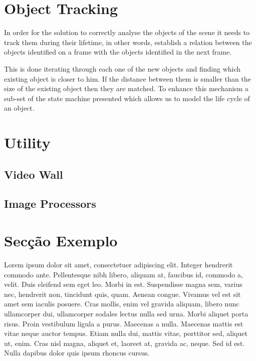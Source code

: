 \section{Object Tracking}

In order for the solution to correctly analyse  the objects of the scene it needs to track them during their lifetime, in other words, establish a relation between the objects identified on a frame with the objects identified in the next frame.

This is done iterating through each one of the new objects and finding which existing object is closer to him. If the distance between them is smaller than the size of the existing object then they are matched. To enhance this mechanism a sub-set of the state machine presented  which allows us to model the life cycle of an object. 




\section{Utility}

\subsection{Video Wall}

\subsection{Image Processors}

\section{Secção Exemplo}


Lorem ipsum dolor sit amet, consectetuer adipiscing elit. Integer
hendrerit commodo ante. Pellentesque nibh libero, aliquam at, faucibus
id, commodo a, velit. 
Duis eleifend sem eget leo. Morbi in est. Suspendisse magna sem,
varius nec, hendrerit non, tincidunt quis, quam. Aenean congue. 
Vivamus vel est sit amet sem iaculis posuere. Cras mollis, enim vel
gravida aliquam, libero nunc ullamcorper dui, ullamcorper sodales
lectus nulla sed urna. Morbi aliquet porta risus. 
Proin vestibulum ligula a purus. Maecenas a nulla. 
Maecenas mattis est vitae neque auctor tempus. Etiam nulla dui,
mattis vitae, porttitor sed, aliquet ut, enim. Cras nisl magna,
aliquet et, laoreet at, gravida ac, neque. Sed id est. Nulla dapibus
dolor quis ipsum rhoncus cursus.

